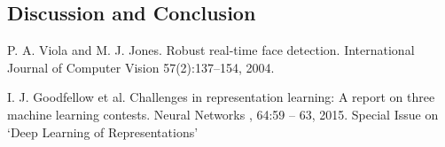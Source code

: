 \documentclass[twoside]{article}
\begin{document}
\begin{multicols}{2}

\section{Discussion and Conclusion}




\begin{thebibliography}{9}

  	P. A. Viola and M. J. Jones. Robust real-time face detection.
	International Journal of Computer Vision
	57(2):137–154, 2004.

	I. J. Goodfellow et al.
	Challenges in representation learning: A report on three machine
	learning contests.
	Neural Networks
	, 64:59 – 63, 2015.
	Special Issue on ‘Deep Learning of Representations’

 
\end{thebibliography}


\end{multicols}
\end{document}

